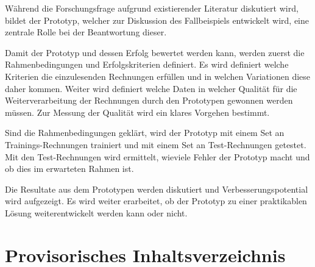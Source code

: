 \documentclass[12pt, twoside, table]{extarticle}
\begin{document}

Während die Forschungsfrage aufgrund existierender Literatur diskutiert wird, bildet der Prototyp, welcher zur Diskussion des Fallbeispiels entwickelt wird, eine zentrale Rolle bei der Beantwortung dieser.

Damit der Prototyp und dessen Erfolg bewertet werden kann, werden zuerst die Rahmenbedingungen und Erfolgskriterien definiert. Es wird definiert welche Kriterien die einzulesenden Rechnungen erfüllen und in welchen Variationen diese daher kommen. Weiter wird definiert welche Daten in welcher Qualität für die Weiterverarbeitung der Rechnungen durch den Prototypen gewonnen werden müssen. Zur Messung der Qualität wird ein klares Vorgehen bestimmt.

Sind die Rahmenbedingungen geklärt, wird der Prototyp mit einem Set an Trainings-Rechnungen trainiert und mit einem Set an Test-Rechnungen getestet. Mit den Test-Rechnungen wird ermittelt, wieviele Fehler der Prototyp macht und ob dies im erwarteten Rahmen ist.

Die Resultate aus dem Prototypen werden diskutiert und Verbesserungspotential wird aufgezeigt. Es wird weiter erarbeitet, ob der Prototyp zu einer praktikablen Lösung weiterentwickelt werden kann oder nicht.
 
\newpage
\section{Provisorisches Inhaltsverzeichnis} 

\end{document}
